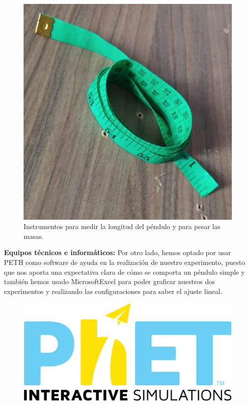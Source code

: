 \documentclass[10pt,a4paper]{article}
\begin{document}
\begin{multicols}{2}
\begin{figure}[H]
	\includegraphics[scale=0.07]{imagenes-proyecto/cinta.jpeg}
	\captionsetup{justification=centering}
	\caption{Instrumentos para medir la longitud del péndulo y para pesar las masas.}
	\label{instrumentos}
\end{figure}
{\textbf {Equipos técnicos e informáticos:}}  Por otro lado, hemos optado por usar PETH como software de ayuda en la realización de nuestro experimento, puesto que nos aporta una expectativa clara de cómo se comporta un péndulo simple y también hemos usado MicrosoftExcel para poder graficar nuestros dos experimentos y realizando las configuraciones para saber el ajuste lineal.
\begin{figure}[H]
\raggedright
\includegraphics[scale=0.18]{imagenes-proyecto/phet.png}   


\end{figure}
\end{multicols}
\end{document}
